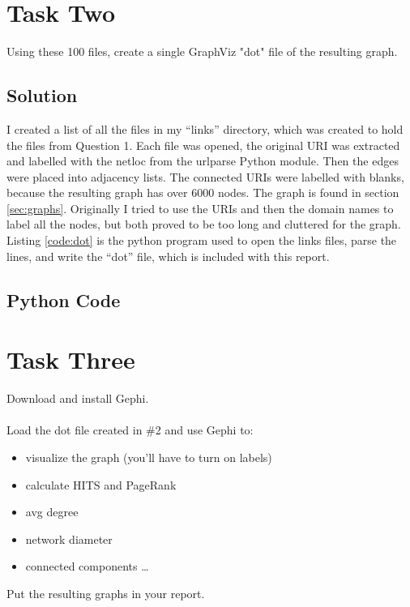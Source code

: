 \documentclass[paper=a4, fontsize=11pt]{scrartcl} %
\numberwithin{equation}{section} %
\numberwithin{figure}{section} %
\numberwithin{table}{section} %
\begin{document}
\section{Task Two}
Using these 100 files, create a single GraphViz "dot" file of the resulting graph.

\subsection{Solution}
I created a list of all the files in my ``links'' directory, which was created to hold the files from Question 1.  
Each file was opened, the original URI was extracted and labelled with the netloc from the urlparse Python module. \cite{bib:urlparse}
Then the edges were placed into adjacency lists.\cite{bib:dot}
The connected URIs were labelled with blanks, because the resulting graph has over 6000 nodes.
The graph is found in section \ref{sec:graphs}.
Originally I tried to use the URIs and then the domain names to label all the nodes, but both proved to be too long and cluttered for the graph.
Listing \ref{code:dot} is the python program used to open the links files, parse the lines, and write the ``dot'' file, which is included with this report.

\subsection{Python Code}


\newpage

\section{Task Three}
Download and install Gephi.
\\
\\
Load the dot file created in \#2 and use Gephi to:
\begin{itemize}
\item visualize the graph (you'll have to turn on labels)
\item calculate HITS and PageRank
\item avg degree
\item network diameter
\item connected components \ldots
\end{itemize}	
Put the resulting graphs in your report.
\end{document}
